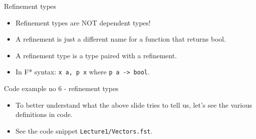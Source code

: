 \documentclass{beamer}
\newcommand{\m}[1]{\texttt{#1}}
\begin{document}
\begin{frame}{Refinement types}
\begin{itemize}
    \item Refinement types are NOT dependent types!
    \item A refinement is just a different name for a function that returns bool.
    \item A refinement type is a type paired with a refinement.
    \item In F* syntax: \m{x \: a, p x} where \m{p \: a -> bool}.
\end{itemize}
\end{frame}

\begin{frame}{Code example no 6 - refinement types}
\begin{itemize}
    \item To better understand what the above slide tries to tell us, let's see the various definitions in code.
    \item See the code snippet \m{Lecture1/Vectors.fst}.
\end{itemize}
\end{frame}


\end{document}
